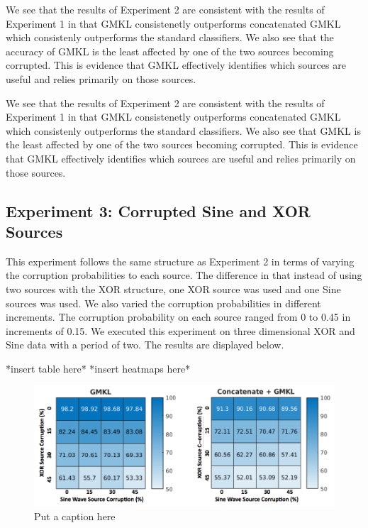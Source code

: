 \documentclass{article}
\begin{document}
We see that the results of Experiment 2 are consistent with the results of
Experiment 1 in that GMKL consistenetly outperforms concatenated GMKL which
consistenly outperforms the standard classifiers. We also see that the accuracy
of GMKL is the least affected by one of the two sources becoming corrupted.
This is evidence that GMKL effectively identifies which sources are useful and
relies primarily on those sources.

We see that the results of Experiment 2 are consistent with the results of
Experiment 1 in that GMKL consistenetly outperforms concatenated GMKL which
consistenly outperforms the standard classifiers. We also see that GMKL is the
least affected by one of the two sources becoming corrupted. This is evidence
that GMKL effectively identifies which sources are useful and relies primarily
on those sources.


\subsection*{Experiment 3: Corrupted Sine and XOR Sources}

This experiment follows the same structure as Experiment 2 in terms of varying
the corruption probabilities to each source. The difference in that instead of
using two sources with the XOR structure, one XOR source was used and one Sine
sources was used. We also varied the corruption probabilities in different
increments. The corruption probability on each source ranged from 0 to 0.45 in
increments of 0.15. We executed this experiment on three dimensional XOR and
Sine data with a period of two. The results are displayed below.

*insert table here*
*insert heatmaps here*
\begin{figure}
    \centering
    \includegraphics[width=\textwidth]{SineXORCorrupt.png}
    \caption{Put a caption here}
    \label{fig:sinexor_heatmaps}
\end{figure}
\end{document}
